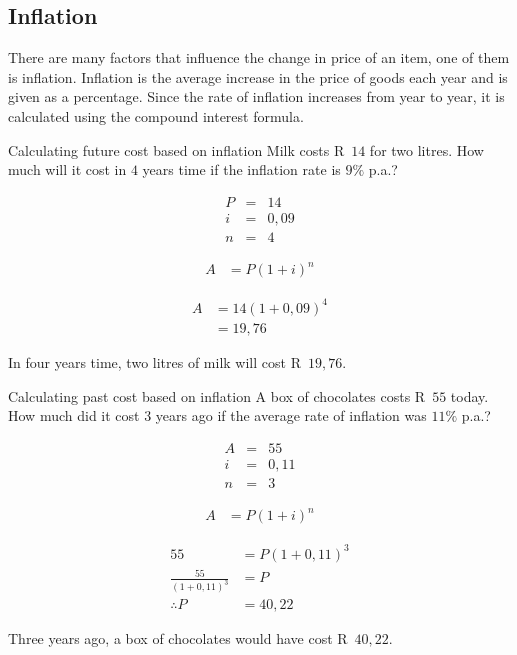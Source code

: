 \subsection{Inflation}

There are many factors that influence the change in price of an item,
one of them is inflation. Inflation is the average increase in the
price of goods each year and is given as a percentage. Since the rate
of inflation increases from year to year, it is calculated using the
compound interest formula.


\begin{wex}{Calculating future cost based on inflation}
{Milk costs R~$14$ for two litres. How much will it cost in $4$ years
  time if the inflation rate is $9\%$ p.a.?}
{
    \begin{eqnarray*}
	P &=& 14\\
	i &=& 0,09\\
	n &=& 4
    \end{eqnarray*}

    \begin{align*}
	A &= P(1 + i)^n
    \end{align*}

    \begin{align*}
	A &= 14(1 + 0,09)^4\\
	  &= 19,76
    \end{align*}

    In four years time, two litres of milk will cost R~$19,76$.
    }
\end{wex}


\begin{wex}{Calculating past cost based on inflation}
{A box of chocolates costs R~$55$ today. How much did it cost $3$
  years ago if the average rate of inflation was $11\%$ p.a.?}
{
    \begin{eqnarray*}
	A &=& 55\\
	i &=& 0,11\\
	n &=& 3
    \end{eqnarray*}

    \begin{align*}
	A &= P(1 + i)^n
    \end{align*}

    \begin{align*}
	55 &= P(1 + 0,11)^3\\
	\frac{55}{(1 + 0,11)^3} &= P\\
	\therefore P  &= 40,22
    \end{align*}

    Three years ago, a box of chocolates would have cost R~$40,22$.
    }
\end{wex}


